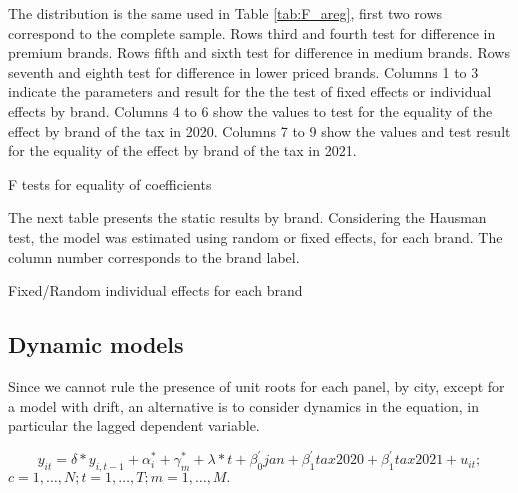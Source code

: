 \documentclass[]{article}
\begin{document}
The distribution is the same used in Table \ref{tab:F_areg}, first two rows correspond to the complete sample. Rows third and fourth test for difference in premium brands. Rows fifth and sixth test for difference in medium brands. Rows seventh and eighth test for difference in lower priced brands.
Columns 1 to 3 indicate the parameters and result for the the test of fixed effects or individual effects by brand. Columns 4 to 6 show the values to test for the equality of the effect by brand of the tax in 2020. Columns 7 to 9 show the values and test result for the equality of the effect by brand of the tax in 2021.

\begin{landscape}
	\begin{table}[ht]
		\centering
		\caption{F tests for equality of coefficients \label{tab:F_xtreg}} 
	
	\end{table}
\end{landscape}
%	

The next table presents the static results by brand. Considering the Hausman test, the model was estimated using random or fixed effects, for each brand. The column number corresponds to the brand label.


\begin{landscape}
	\begin{table}[ht]
		\centering
		\caption{Fixed/Random individual effects for each brand \label{tab:static_xtreg_marcas}} 
	
	\end{table}
\end{landscape}


%
%
 
\subsection{Dynamic models}
Since we cannot rule the presence of unit roots for each panel, by city, except for a model with drift, an alternative is to consider dynamics in the equation, in particular the lagged dependent variable. 

\begin{equation*} 
	y_{it}  = \delta*y_{i,t-1} + \alpha_{i}^{*} + \gamma_{m}^{*} + \lambda*t + \beta_{0}^{'}jan + \beta_{1}^{'}tax2020 + \beta_{1}^{'}tax2021 + u_{it}
	;   \tag{4.3}
\end{equation*}
$c  = 1,\ldots,N;  t=1,\ldots,T; m=1,\ldots,M. $
\end{document}
